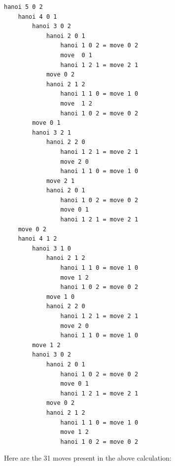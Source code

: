 \documentclass{article}
\theoremstyle{theorem}
\theoremstyle{definition}
\theoremstyle{remark}
\begin{document}
\begin{lstlisting}
hanoi 5 0 2  
    hanoi 4 0 1 
        hanoi 3 0 2
            hanoi 2 0 1 
                hanoi 1 0 2 = move 0 2 
                move  0 1
                hanoi 1 2 1 = move 2 1
            move 0 2  
            hanoi 2 1 2
                hanoi 1 1 0 = move 1 0  
                move  1 2  
                hanoi 1 0 2 = move 0 2
        move 0 1
        hanoi 3 2 1
            hanoi 2 2 0 
                hanoi 1 2 1 = move 2 1
                move 2 0
                hanoi 1 1 0 = move 1 0
            move 2 1 
            hanoi 2 0 1 
                hanoi 1 0 2 = move 0 2
                move 0 1
                hanoi 1 2 1 = move 2 1 
    move 0 2 
    hanoi 4 1 2 
        hanoi 3 1 0
            hanoi 2 1 2 
                hanoi 1 1 0 = move 1 0
                move 1 2
                hanoi 1 0 2 = move 0 2 
            move 1 0
            hanoi 2 2 0
                hanoi 1 2 1 = move 2 1
                move 2 0
                hanoi 1 1 0 = move 1 0
        move 1 2
        hanoi 3 0 2 
            hanoi 2 0 1
                hanoi 1 0 2 = move 0 2
                move 0 1
                hanoi 1 2 1 = move 2 1
            move 0 2
            hanoi 2 1 2
                hanoi 1 1 0 = move 1 0
                move 1 2
                hanoi 1 0 2 = move 0 2
\end{lstlisting}

Here are the 31 moves present in the above calculation:
\end{document}
